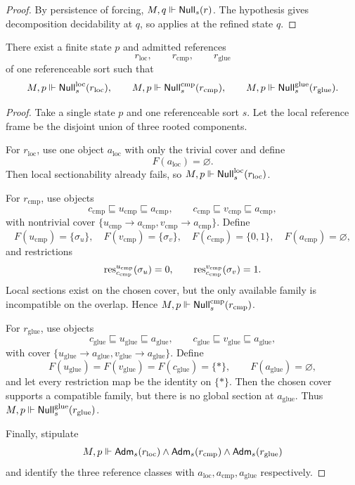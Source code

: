 \begin{proof}
By persistence of forcing, $M,q\Vdash \mathsf{Null}_s(r)$. The hypothesis gives decomposition decidability at $q$, so  applies at the refined state $q$.
\end{proof}

\begin{proposition}\label{prop:finite-three-mode-model}
There exist a finite state $p$ and admitted references
\[
r_{\mathrm{loc}},\qquad r_{\mathrm{cmp}},\qquad r_{\mathrm{glue}}
\]
of one referenceable sort such that
\[
M,p\Vdash \mathsf{Null}^{\mathrm{loc}}_s(r_{\mathrm{loc}}),\qquad
M,p\Vdash \mathsf{Null}^{\mathrm{cmp}}_s(r_{\mathrm{cmp}}),\qquad
M,p\Vdash \mathsf{Null}^{\mathrm{glue}}_s(r_{\mathrm{glue}}).
\]
\end{proposition}

\begin{proof}
Take a single state $p$ and one referenceable sort $s$. Let the local reference frame be the disjoint union of three rooted components.

For $r_{\mathrm{loc}}$, use one object $a_{\mathrm{loc}}$ with only the trivial cover and define
\[
F(a_{\mathrm{loc}})=\varnothing.
\]
Then local sectionability already fails, so $M,p\Vdash \mathsf{Null}^{\mathrm{loc}}_s(r_{\mathrm{loc}})$.

For $r_{\mathrm{cmp}}$, use objects
\[
c_{\mathrm{cmp}}\sqsubseteq u_{\mathrm{cmp}}\sqsubseteq a_{\mathrm{cmp}},
\qquad
c_{\mathrm{cmp}}\sqsubseteq v_{\mathrm{cmp}}\sqsubseteq a_{\mathrm{cmp}},
\]
with nontrivial cover $\{u_{\mathrm{cmp}}\to a_{\mathrm{cmp}},v_{\mathrm{cmp}}\to a_{\mathrm{cmp}}\}$. Define
\[
F(u_{\mathrm{cmp}})=\{\sigma_u\},\quad
F(v_{\mathrm{cmp}})=\{\sigma_v\},\quad
F(c_{\mathrm{cmp}})=\{0,1\},\quad
F(a_{\mathrm{cmp}})=\varnothing,
\]
and restrictions
\[
\mathrm{res}_{c_{\mathrm{cmp}}}^{u_{\mathrm{cmp}}}(\sigma_u)=0,
\qquad
\mathrm{res}_{c_{\mathrm{cmp}}}^{v_{\mathrm{cmp}}}(\sigma_v)=1.
\]
Local sections exist on the chosen cover, but the only available family is incompatible on the overlap. Hence $M,p\Vdash \mathsf{Null}^{\mathrm{cmp}}_s(r_{\mathrm{cmp}})$.

For $r_{\mathrm{glue}}$, use objects
\[
c_{\mathrm{glue}}\sqsubseteq u_{\mathrm{glue}}\sqsubseteq a_{\mathrm{glue}},
\qquad
c_{\mathrm{glue}}\sqsubseteq v_{\mathrm{glue}}\sqsubseteq a_{\mathrm{glue}},
\]
with cover $\{u_{\mathrm{glue}}\to a_{\mathrm{glue}},v_{\mathrm{glue}}\to a_{\mathrm{glue}}\}$. Define
\[
F(u_{\mathrm{glue}})=F(v_{\mathrm{glue}})=F(c_{\mathrm{glue}})=\{*\},
\qquad
F(a_{\mathrm{glue}})=\varnothing,
\]
and let every restriction map be the identity on $\{*\}$. Then the chosen cover supports a compatible family, but there is no global section at $a_{\mathrm{glue}}$. Thus $M,p\Vdash \mathsf{Null}^{\mathrm{glue}}_s(r_{\mathrm{glue}})$.

Finally, stipulate
\[
M,p\Vdash \mathsf{Adm}_s(r_{\mathrm{loc}})\land \mathsf{Adm}_s(r_{\mathrm{cmp}})\land \mathsf{Adm}_s(r_{\mathrm{glue}})
\]
and identify the three reference classes with $a_{\mathrm{loc}},a_{\mathrm{cmp}},a_{\mathrm{glue}}$ respectively.
\end{proof}

